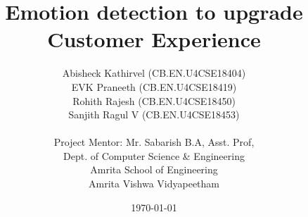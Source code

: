 \documentclass[12 points, a4paper]{article} %
\date{\today} %
\begin{document}
\title{Emotion detection to upgrade Customer Experience}

\author{
Abisheck Kathirvel (CB.EN.U4CSE18404) \\
EVK Praneeth (CB.EN.U4CSE18419) \\
Rohith Rajesh (CB.EN.U4CSE18450) \\
Sanjith Ragul V (CB.EN.U4CSE18453) \\
\\ %
Project Mentor: Mr. Sabarish B.A, Asst. Prof,\\
Dept. of Computer Science \& Engineering\\
Amrita School of Engineering\\
Amrita Vishwa Vidyapeetham
       }%
\maketitle
\thispagestyle{empty}
\end{document}
